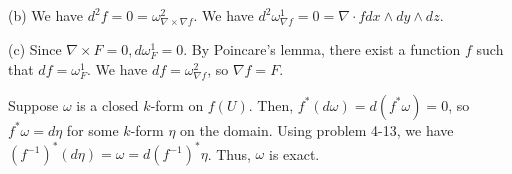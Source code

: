 \documentclass[11pt]{scrartcl}
\begin{document}
(b) We have $d^2f = 0 = \omega^2_{\nabla\times\nabla f}$.
We have $d^2\omega^1_{\nabla f} = 0 = \nabla\cdot f dx\wedge dy\wedge dz$.

(c) Since $\nabla\times F = 0, d\omega^1_F = 0$.
By Poincare's lemma, there exist a function $f$ such that $df = \omega^1_F$.
We have $df = \omega^2_{\nabla f}$, so $\nabla f = F$.

\begin{problem*}[4-20]
\end{problem*}
Suppose $\omega$ is a closed $k$-form on $f(U)$.
Then, $f^*(d\omega) = d(f^*\omega) = 0$, so $f^*\omega = d\eta$ for some $k$-form $\eta$ on the domain.
Using problem 4-13, we have $(f^{-1})^*(d\eta) = \omega = d(f^{-1})^*\eta$.
Thus, $\omega$ is exact.
\end{document}
